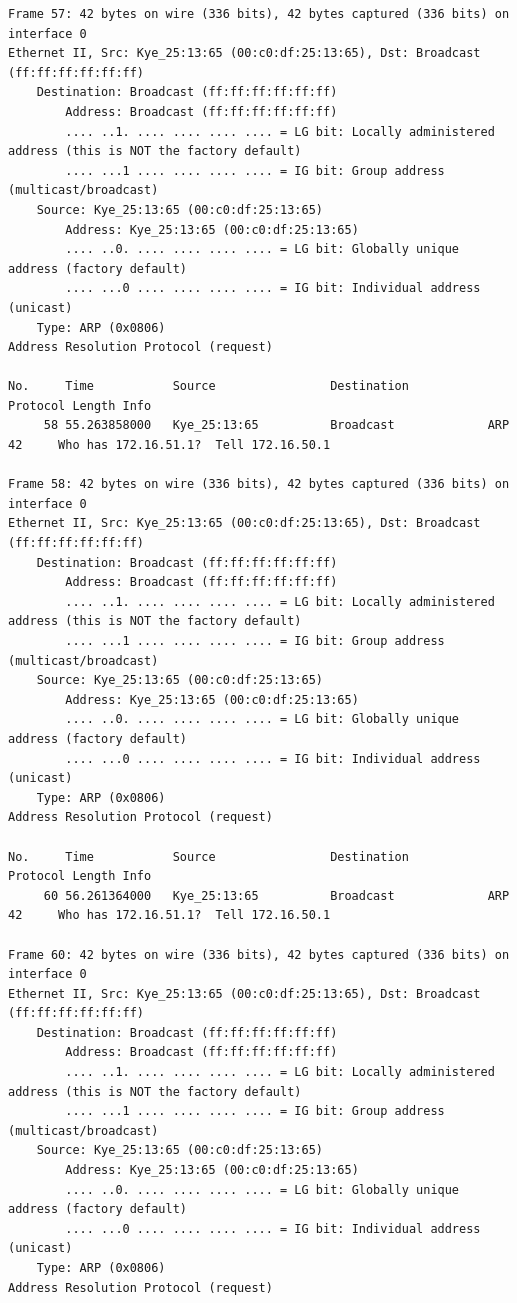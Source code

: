 \documentclass[a4paper,11pt]{article}
\begin{document}
\begin{lstlisting}
Frame 57: 42 bytes on wire (336 bits), 42 bytes captured (336 bits) on interface 0
Ethernet II, Src: Kye_25:13:65 (00:c0:df:25:13:65), Dst: Broadcast (ff:ff:ff:ff:ff:ff)
    Destination: Broadcast (ff:ff:ff:ff:ff:ff)
        Address: Broadcast (ff:ff:ff:ff:ff:ff)
        .... ..1. .... .... .... .... = LG bit: Locally administered address (this is NOT the factory default)
        .... ...1 .... .... .... .... = IG bit: Group address (multicast/broadcast)
    Source: Kye_25:13:65 (00:c0:df:25:13:65)
        Address: Kye_25:13:65 (00:c0:df:25:13:65)
        .... ..0. .... .... .... .... = LG bit: Globally unique address (factory default)
        .... ...0 .... .... .... .... = IG bit: Individual address (unicast)
    Type: ARP (0x0806)
Address Resolution Protocol (request)

No.     Time           Source                Destination           Protocol Length Info
     58 55.263858000   Kye_25:13:65          Broadcast             ARP      42     Who has 172.16.51.1?  Tell 172.16.50.1

Frame 58: 42 bytes on wire (336 bits), 42 bytes captured (336 bits) on interface 0
Ethernet II, Src: Kye_25:13:65 (00:c0:df:25:13:65), Dst: Broadcast (ff:ff:ff:ff:ff:ff)
    Destination: Broadcast (ff:ff:ff:ff:ff:ff)
        Address: Broadcast (ff:ff:ff:ff:ff:ff)
        .... ..1. .... .... .... .... = LG bit: Locally administered address (this is NOT the factory default)
        .... ...1 .... .... .... .... = IG bit: Group address (multicast/broadcast)
    Source: Kye_25:13:65 (00:c0:df:25:13:65)
        Address: Kye_25:13:65 (00:c0:df:25:13:65)
        .... ..0. .... .... .... .... = LG bit: Globally unique address (factory default)
        .... ...0 .... .... .... .... = IG bit: Individual address (unicast)
    Type: ARP (0x0806)
Address Resolution Protocol (request)

No.     Time           Source                Destination           Protocol Length Info
     60 56.261364000   Kye_25:13:65          Broadcast             ARP      42     Who has 172.16.51.1?  Tell 172.16.50.1

Frame 60: 42 bytes on wire (336 bits), 42 bytes captured (336 bits) on interface 0
Ethernet II, Src: Kye_25:13:65 (00:c0:df:25:13:65), Dst: Broadcast (ff:ff:ff:ff:ff:ff)
    Destination: Broadcast (ff:ff:ff:ff:ff:ff)
        Address: Broadcast (ff:ff:ff:ff:ff:ff)
        .... ..1. .... .... .... .... = LG bit: Locally administered address (this is NOT the factory default)
        .... ...1 .... .... .... .... = IG bit: Group address (multicast/broadcast)
    Source: Kye_25:13:65 (00:c0:df:25:13:65)
        Address: Kye_25:13:65 (00:c0:df:25:13:65)
        .... ..0. .... .... .... .... = LG bit: Globally unique address (factory default)
        .... ...0 .... .... .... .... = IG bit: Individual address (unicast)
    Type: ARP (0x0806)
Address Resolution Protocol (request)


\end{lstlisting}
\end{document}
